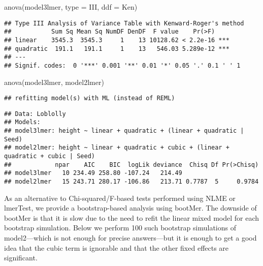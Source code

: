 \documentclass[
]{book}
\newenvironment{Shaded}{\begin{snugshade}}{\end{snugshade}}
\newcommand{\AttributeTok}[1]{\textcolor[rgb]{0.77,0.63,0.00}{#1}}
\newcommand{\FunctionTok}[1]{\textcolor[rgb]{0.00,0.00,0.00}{#1}}
\newcommand{\NormalTok}[1]{#1}
\newcommand{\StringTok}[1]{\textcolor[rgb]{0.31,0.60,0.02}{#1}}
\begin{document}
\begin{Shaded}
\begin{Highlighting}[]
\FunctionTok{anova}\NormalTok{(model3lmer, }\AttributeTok{type =} \StringTok{\textquotesingle{}III\textquotesingle{}}\NormalTok{, }\AttributeTok{ddf =} \StringTok{\textquotesingle{}Ken\textquotesingle{}}\NormalTok{)}
\end{Highlighting}
\end{Shaded}

\begin{verbatim}
## Type III Analysis of Variance Table with Kenward-Roger's method
##           Sum Sq Mean Sq NumDF DenDF  F value    Pr(>F)    
## linear    3545.3  3545.3     1    13 10128.62 < 2.2e-16 ***
## quadratic  191.1   191.1     1    13   546.03 5.289e-12 ***
## ---
## Signif. codes:  0 '***' 0.001 '**' 0.01 '*' 0.05 '.' 0.1 ' ' 1
\end{verbatim}

\begin{Shaded}
\begin{Highlighting}[]
\FunctionTok{anova}\NormalTok{(model3lmer, model2lmer)}
\end{Highlighting}
\end{Shaded}

\begin{verbatim}
## refitting model(s) with ML (instead of REML)
\end{verbatim}

\begin{verbatim}
## Data: Loblolly
## Models:
## model3lmer: height ~ linear + quadratic + (linear + quadratic | Seed)
## model2lmer: height ~ linear + quadratic + cubic + (linear + quadratic + cubic | Seed)
##            npar    AIC    BIC  logLik deviance  Chisq Df Pr(>Chisq)
## model3lmer   10 234.49 258.80 -107.24   214.49                     
## model2lmer   15 243.71 280.17 -106.86   213.71 0.7787  5     0.9784
\end{verbatim}

As an alternative to Chi-squared/F-based tests performed using NLME or lmerTest, we provide a bootstrap-based analysis using bootMer. The downside of bootMer is that it is slow due to the need to refit the linear mixed model for each bootstrap simulation. Below we perform 100 such bootstrap simulations of model2---which is not enough for precise answers---but it is enough to get a good idea that the cubic term is ignorable and that the other fixed effects are significant.
\end{document}
